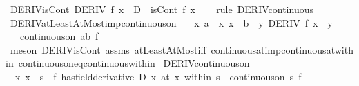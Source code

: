 \begin{isabellebody}
\endisatagproof
{\isafoldproof}%
%
\isadelimproof
\isanewline
%
\endisadelimproof
\isanewline
{}\isamarkupfalse%
\ DERIV{\isacharunderscore}{\kern0pt}isCont{\isacharcolon}{\kern0pt}\ {\isachardoublequoteopen}DERIV\ f\ x\ {\isacharcolon}{\kern0pt}{\isachargreater}{\kern0pt}\ D\ {\isasymLongrightarrow}\ isCont\ f\ x{\isachardoublequoteclose}\isanewline
%
\isadelimproof
\ \ %
\endisadelimproof
%
\isatagproof
{}\isamarkupfalse%
\ {\isacharparenleft}{\kern0pt}rule\ DERIV{\isacharunderscore}{\kern0pt}continuous{\isacharparenright}{\kern0pt}%
\endisatagproof
{\isafoldproof}%
%
\isadelimproof
\isanewline
%
\endisadelimproof
\isanewline
{}\isamarkupfalse%
\ DERIV{\isacharunderscore}{\kern0pt}atLeastAtMost{\isacharunderscore}{\kern0pt}imp{\isacharunderscore}{\kern0pt}continuous{\isacharunderscore}{\kern0pt}on{\isacharcolon}{\kern0pt}\isanewline
\ \ \ {\isachardoublequoteopen}{\isasymAnd}x{\isachardot}{\kern0pt}\ {\isasymlbrakk}a\ {\isasymle}\ x{\isacharsemicolon}{\kern0pt}\ x\ {\isasymle}\ b{\isasymrbrakk}\ {\isasymLongrightarrow}\ {\isasymexists}y{\isachardot}{\kern0pt}\ DERIV\ f\ x\ {\isacharcolon}{\kern0pt}{\isachargreater}{\kern0pt}\ y{\isachardoublequoteclose}\isanewline
\ \ \ {\isachardoublequoteopen}continuous{\isacharunderscore}{\kern0pt}on\ {\isacharbraceleft}{\kern0pt}a{\isachardot}{\kern0pt}{\isachardot}{\kern0pt}b{\isacharbraceright}{\kern0pt}\ f{\isachardoublequoteclose}\isanewline
%
\isadelimproof
\ \ %
\endisadelimproof
%
\isatagproof
{}\isamarkupfalse%
\ {\isacharparenleft}{\kern0pt}meson\ DERIV{\isacharunderscore}{\kern0pt}isCont\ assms\ atLeastAtMost{\isacharunderscore}{\kern0pt}iff\ continuous{\isacharunderscore}{\kern0pt}at{\isacharunderscore}{\kern0pt}imp{\isacharunderscore}{\kern0pt}continuous{\isacharunderscore}{\kern0pt}at{\isacharunderscore}{\kern0pt}within\ continuous{\isacharunderscore}{\kern0pt}on{\isacharunderscore}{\kern0pt}eq{\isacharunderscore}{\kern0pt}continuous{\isacharunderscore}{\kern0pt}within{\isacharparenright}{\kern0pt}%
\endisatagproof
{\isafoldproof}%
%
\isadelimproof
\isanewline
%
\endisadelimproof
\isanewline
{}\isamarkupfalse%
\ DERIV{\isacharunderscore}{\kern0pt}continuous{\isacharunderscore}{\kern0pt}on{\isacharcolon}{\kern0pt}\isanewline
\ \ {\isachardoublequoteopen}{\isacharparenleft}{\kern0pt}{\isasymAnd}x{\isachardot}{\kern0pt}\ x\ {\isasymin}\ s\ {\isasymLongrightarrow}\ {\isacharparenleft}{\kern0pt}f\ has{\isacharunderscore}{\kern0pt}field{\isacharunderscore}{\kern0pt}derivative\ {\isacharparenleft}{\kern0pt}D\ x{\isacharparenright}{\kern0pt}{\isacharparenright}{\kern0pt}\ {\isacharparenleft}{\kern0pt}at\ x\ within\ s{\isacharparenright}{\kern0pt}{\isacharparenright}{\kern0pt}\ {\isasymLongrightarrow}\ continuous{\isacharunderscore}{\kern0pt}on\ s\ f{\isachardoublequoteclose}\isanewline

\end{isabellebody}
